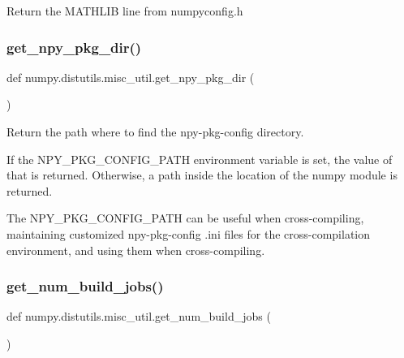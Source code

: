 \begin{DoxyVerb}Return the MATHLIB line from numpyconfig.h
\end{DoxyVerb}
 \mbox{\label{namespacenumpy_1_1distutils_1_1misc__util_aa82e150828327e03d9e8629bf1d0e9eb}} 
\subsubsection{\texorpdfstring{get\+\_\+npy\+\_\+pkg\+\_\+dir()}{get\_npy\_pkg\_dir()}}
{\footnotesize\ttfamily def numpy.\+distutils.\+misc\+\_\+util.\+get\+\_\+npy\+\_\+pkg\+\_\+dir (\begin{DoxyParamCaption}{ }\end{DoxyParamCaption})}

\begin{DoxyVerb}Return the path where to find the npy-pkg-config directory.

If the NPY_PKG_CONFIG_PATH environment variable is set, the value of that
is returned.  Otherwise, a path inside the location of the numpy module is
returned.

The NPY_PKG_CONFIG_PATH can be useful when cross-compiling, maintaining
customized npy-pkg-config .ini files for the cross-compilation
environment, and using them when cross-compiling.\end{DoxyVerb}
 \mbox{\label{namespacenumpy_1_1distutils_1_1misc__util_a3bb0556bd8f92c36422281395c1eb986}} 
\subsubsection{\texorpdfstring{get\+\_\+num\+\_\+build\+\_\+jobs()}{get\_num\_build\_jobs()}}
{\footnotesize\ttfamily def numpy.\+distutils.\+misc\+\_\+util.\+get\+\_\+num\+\_\+build\+\_\+jobs (\begin{DoxyParamCaption}{ }\end{DoxyParamCaption})}

